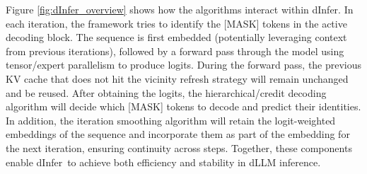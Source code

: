\documentclass[]{antgroup}
\newcommand{\sys}{dInfer}
\begin{document}


Figure \ref{fig:dInfer_overview} shows how the algorithms interact within \sys. 
In each iteration, the framework tries to identify the [MASK] tokens in the active decoding block. The sequence is first embedded (potentially leveraging context from previous iterations), followed by a forward pass through the model using tensor/expert parallelism to produce logits. During the forward pass, the previous KV cache that does not hit the vicinity refresh strategy will remain unchanged and be reused. After obtaining the logits, the hierarchical/credit decoding algorithm will decide which [MASK] tokens to decode and predict their identities. In addition, the iteration smoothing algorithm will retain the logit-weighted embeddings of the sequence and incorporate them as part of the embedding for the next iteration, ensuring continuity across steps. 
Together, these components enable \sys~to achieve both efficiency and stability in dLLM inference.
\end{document}
